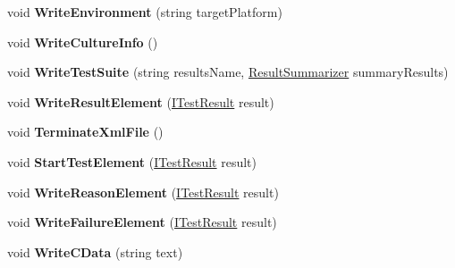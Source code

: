 \begin{DoxyCompactItemize}
void {\bfseries Write\+Environment} (string target\+Platform)
\item 
\mbox{\label{class_unity_test_1_1_xml_result_writer_aef7fbec6126dcf44f0661bc771aba16b}} 
void {\bfseries Write\+Culture\+Info} ()
\item 
\mbox{\label{class_unity_test_1_1_xml_result_writer_a159b33f6e45ab6d0728bf52da28216dd}} 
void {\bfseries Write\+Test\+Suite} (string results\+Name, \hyperlink{class_unity_test_1_1_result_summarizer}{Result\+Summarizer} summary\+Results)
\item 
\mbox{\label{class_unity_test_1_1_xml_result_writer_ac3b64dee42473c685f5816be0d9c1bcb}} 
void {\bfseries Write\+Result\+Element} (\hyperlink{interface_i_test_result}{I\+Test\+Result} result)
\item 
\mbox{\label{class_unity_test_1_1_xml_result_writer_a1f58843ef4cadf85cb75345793e5668c}} 
void {\bfseries Terminate\+Xml\+File} ()
\item 
\mbox{\label{class_unity_test_1_1_xml_result_writer_a768ab39a7139b12ddb767cec4fa49f91}} 
void {\bfseries Start\+Test\+Element} (\hyperlink{interface_i_test_result}{I\+Test\+Result} result)
\item 
\mbox{\label{class_unity_test_1_1_xml_result_writer_a56763690fe6636c33002d4ab579c2f6a}} 
void {\bfseries Write\+Reason\+Element} (\hyperlink{interface_i_test_result}{I\+Test\+Result} result)
\item 
\mbox{\label{class_unity_test_1_1_xml_result_writer_ae2aa21f1a9112892147cdca369342845}} 
void {\bfseries Write\+Failure\+Element} (\hyperlink{interface_i_test_result}{I\+Test\+Result} result)
\item 
\mbox{\label{class_unity_test_1_1_xml_result_writer_afe6f90960e4693030c63ed99adc346cd}} 
void {\bfseries Write\+C\+Data} (string text)
\end{DoxyCompactItemize}
